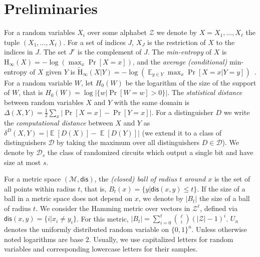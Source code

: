 \documentclass[11pt]{article}
\DeclareMathOperator*{\expe}{\mathbb{E}}
\newcommand{\dis}{\ensuremath{\mathsf{dis}}}
\newcommand{\Hoo}{\mathrm{H}_\infty}
\newcommand{\Hav}{\tilde{\mathrm{H}}_\infty}
\begin{document}
\section{Preliminaries}
\label{sec:preliminaries}
For a random variables $X_i$ over some alphabet $\mathcal{Z}$ we denote by $X = X_1,..., X_\ell$  the tuple $(X_1,\dots, X_\ell)$.  For a set of indices $J$, $X_{J}$ is the restriction of $X$ to the indices in $J$.  The set $J^c$ is the complement of $J$.  The {\em min-entropy} of $X$ is $\Hoo(X) = -\log(\max_x \Pr[X=x])$,
and the {\em average (conditional)} min-entropy of $X$ given $Y$ is  $\Hav(X|Y) = -\log(\expe_{y\in Y} \max_{x} \Pr[X=x|Y=y])$~\cite[Section 2.4]{DBLP:journals/siamcomp/DodisORS08}.   For a random variable $W$, let $H_0(W)$ be the logarithm of the size of the support of $W$,  that is $H_0(W) = \log |\{w | \Pr[W=w]>0\}|$.
The {\em statistical distance} between random variables $X$ and $Y$ with the same domain is $\Delta(X,Y) = \frac12 \sum_x |\Pr[X=x] - \Pr[Y=x]|$.
For a distinguisher $D$ we write the \emph{computational distance} between $X$ and $Y$ as $\delta^D(X,Y) = \left| \expe[D(X)]-\expe[D(Y)]\right |$ (we extend it to a class of distinguishers $\mathcal{D}$ by taking the maximum over all distinguishers $D\in\mathcal{D}$).  We denote by $\mathcal{D}_{s}$ the class of randomized circuits which output a single bit and have size at most $s$.

For a metric space $(\mathcal{M}, \dis)$, the \emph{(closed) ball of radius $t$ around $x$} is the set of all points within radius $t$, that is, $B_t(x) = \{y| \dis(x, y)\leq t\}$.  If the size of a ball in a metric space does not depend on $x$, we denote by $|B_t|$ the size of a ball of radius $t$.  We consider the Hamming metric over vectors in $\mathcal{Z}^\ell$, defined via $\dis(x,y) = \{i | x_i \neq y_i\}$.  For this metric, $|B_t| = \sum_{i=0}^t {\ell \choose i} (|\mathcal{Z}|-1)^i $.  $U_n$ denotes the uniformly  distributed random variable on $\{0,1\}^n$.  Unless otherwise noted logarithms are base $2$.
Usually, we use capitalized letters for random variables and corresponding lowercase letters for their samples.
\end{document}
